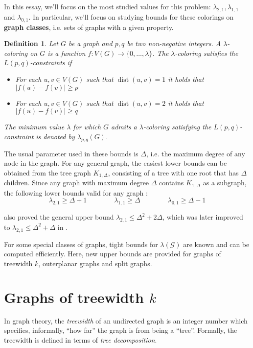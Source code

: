 \documentclass[12pt,a4paper]{article}
\newtheorem{definition}{Definition}
\newcommand{\curlyquotes}[1]{\textquotedblleft #1\textquotedblright}
\newcommand{\abs}[1]{\left|#1\right|}
\DeclareMathOperator{\dist}{dist}
\begin{document}
    In this essay, we'll focus on the most studied values for this problem: $\lambda_{2,1}, \lambda_{1,1}$ and $\lambda_{0,1}$. In particular, we'll focus on studying bounds for these colorings on \textbf{graph classes}, i.e. sets of graphs with a given property.

    \begin{definition}
      Let $G$ be a graph and $p,q$ be two non-negative integers. A $\lambda$-coloring on $G$ is a function $f : V(G) \to \{0, \ldots , \lambda\}$. The $\lambda$-coloring satisfies the $L(p, q)$-constraints if
      \begin{itemize}
        \item For each $u,v \in V(G)$ such that $\dist(u,v) = 1$ it holds that $\abs{f(u) - f(v)} \geq p$
        \item For each $u,v \in V(G)$ such that $\dist(u,v) = 2$ it holds that $\abs{f(u) - f(v)} \geq q$
      \end{itemize}
      The minimum value $\lambda$ for which $G$ admits a $\lambda$-coloring satisfying the $L(p,q)$-constraint is denoted by $\lambda_{p,q}(G)$.
    \end{definition}

    The usual parameter used in these bounds is $\Delta$, i.e. the maximum degree of any node in the graph. For any general graph, the easiest lower bounds can be obtained from the tree graph $K_{1,\Delta}$, consisting of a tree with one root that has $\Delta$ children. Since any graph with maximum degree $\Delta$ contains $K_{1,\Delta}$ as a subgraph, the following lower bounds valid for any graph \cite{L21_color,lower_L01}:
    \[\lambda_{2,1} \geq \Delta+1 \qquad\qquad \lambda_{1,1} \geq \Delta \qquad\qquad \lambda_{0,1} \geq \Delta-1\]

    \cite{L21_color} also proved the general upper bound $\lambda_{2,1} \leq \Delta^2+2\Delta$, which was later improved to $\lambda_{2,1} \leq \Delta^2+\Delta$ in \cite{upper_L21}.

    For some special classes of graphs, tight bounds for $\lambda(\mathcal{G})$ are known and can be computed efficiently. Here, new upper bounds are provided for graphs of treewidth $k$, outerplanar graphs and split graphs.

    \section{Graphs of treewidth $k$}

    In graph theory, the \textit{treewidth} of an undirected graph is an integer number which specifies, informally, \curlyquotes{how far} the graph is from being a \curlyquotes{tree}. Formally, the treewidth is defined in terms of \textit{tree decomposition}.
\end{document}
